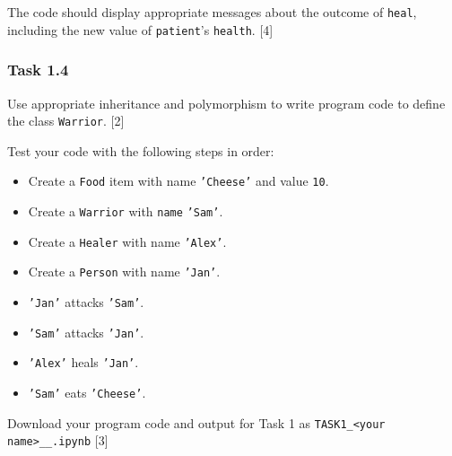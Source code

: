 The code should display appropriate messages about the outcome of
\texttt{heal}, including the new value of \texttt{patient}\textquoteright s
\texttt{health}. \hfill{}{[}4{]}

\subsubsection*{Task 1.4}

Use appropriate inheritance and polymorphism to write program code
to define the class \texttt{Warrior}. \hfill{}{[}2{]}

Test your code with the following steps in order:
\begin{itemize}
\item Create a \texttt{Food} item with name \texttt{'Cheese'} and value
\texttt{10}. 
\item Create a \texttt{Warrior} with \texttt{name} \texttt{'Sam'}. 
\item Create a \texttt{Healer} with name \texttt{'Alex'}. 
\item Create a \texttt{Person} with name \texttt{'Jan'}. 
\item \texttt{'Jan'} attacks \texttt{'Sam'}. 
\item \texttt{'Sam'} attacks \texttt{'Jan'}. 
\item \texttt{'Alex'} heals \texttt{'Jan'}. 
\item \texttt{'Sam'} eats \texttt{'Cheese'}.
\end{itemize}
Download your program code and output for Task 1 as \texttt{TASK1\_<your
name>\_<centre number>\_<index number>.ipynb} \hfill{}{[}3{]}